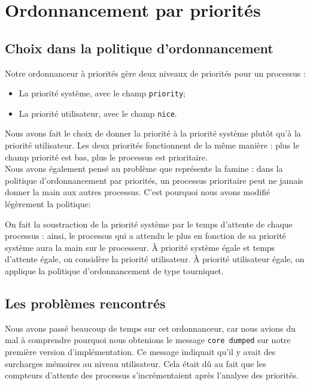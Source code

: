 \section{Ordonnancement par priorités}

\subsection{Choix dans la politique d'ordonnancement}

Notre ordonnanceur à priorités gère deux niveaux de priorités pour un processus :

\begin{itemize}
	\item La priorité système, avec le champ \texttt{priority};
	\item La priorité utilisateur, avec le champ \texttt{nice}.
\end{itemize}

Nous avons fait le choix de donner la priorité à la priorité système plutôt qu'à la priorité utilisateur.
Les deux priorités fonctionnent de la même manière : plus le champ priorité est bas, plus le processus est prioritaire.
\\

Nous avons également pensé au problème que représente la famine : dans la politique d'ordonnancement par priorités, un processus prioritaire peut ne jamais donner la main aux autres processus.
C'est pourquoi nous avons modifié légèrement la politique:

On fait la soustraction de la priorité système par le temps d'attente de chaque processus : ainsi, le processus qui a attendu le plus en fonction de sa priorité système aura la main sur le processeur.
À priorité système égale et temps d'attente égale, on considère la priorité utilisateur.
À priorité utilisateur égale, on applique la politique d'ordonnancement de type tourniquet.
\\

\subsection{Les problèmes rencontrés}

Nous avons passé beaucoup de temps sur cet ordonnanceur, car nous avions du mal à comprendre pourquoi nous obtenions le message \texttt{core dumped} sur notre première version d'implémentation.
Ce message indiquait qu'il y avait des surcharges mémoires au niveau utilisateur.
Cela était dû au fait que les compteurs d'attente des processus s'incrémentaient après l'analyse des priorités.

